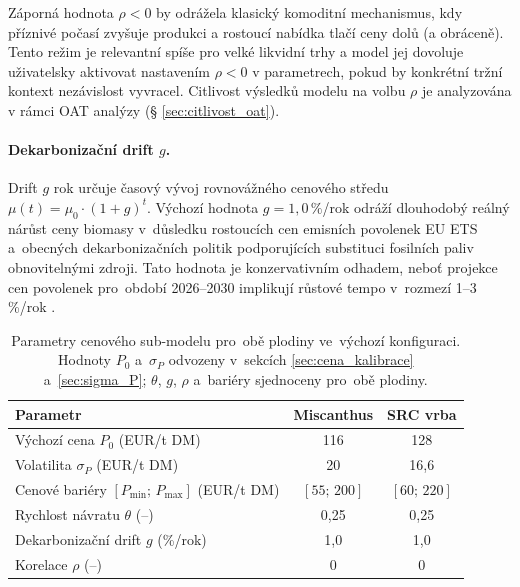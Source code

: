 Záporná hodnota $\rho < 0$ by odrážela klasický komoditní mechanismus, 
kdy příznivé počasí zvyšuje produkci a rostoucí nabídka tlačí ceny dolů 
(a obráceně). Tento režim je relevantní spíše pro velké likvidní trhy 
a model jej dovoluje uživatelsky aktivovat nastavením $\rho < 0$ 
v parametrech, pokud by konkrétní tržní kontext nezávislost vyvracel. 
Citlivost výsledků modelu na volbu $\rho$ je analyzována v rámci OAT 
analýzy (§ \ref{sec:citlivost_oat}).

\paragraph{Dekarbonizační drift $g$.}
Drift $g$ rok určuje časový vývoj rovnovážného
cenového středu $\mu(t) = \mu_0 \cdot (1 + g)^t$.
Výchozí hodnota $g = 1{,}0\,\%$/rok odráží dlouhodobý reálný nárůst
ceny biomasy v~důsledku rostoucích cen emisních povolenek EU ETS
\citep{EuropeanCommission2024} a~obecných dekarbonizačních politik
podporujících substituci fosilních paliv obnovitelnými zdroji.
Tato hodnota je konzervativním odhadem, neboť projekce cen povolenek
pro~období 2026--2030 implikují růstové tempo v~rozmezí
1--3\,\%/rok \citep{ERU2025VymerBiomasa}.


\begin{table}[htbp]
\caption{Parametry cenového sub-modelu pro~obě plodiny ve~výchozí
konfiguraci. Hodnoty $P_0$ a~$\sigma_P$ odvozeny v~sekcích
\ref{sec:cena_kalibrace} a~\ref{sec:sigma_P};
$\theta$, $g$, $\rho$ a~bariéry sjednoceny pro~obě plodiny.}
\label{tab:cenovy_model_param}
\centering
\begin{tabular}{lcc}
\toprule
\textbf{Parametr} & \textbf{Miscanthus} & \textbf{SRC vrba} \\
\midrule
Výchozí cena $P_0$ (EUR/t DM)             & 116     & 128     \\
Volatilita $\sigma_P$ (EUR/t DM)          & 20      & 16{,}6  \\
Cenové bariéry $[P_{\min};\, P_{\max}]$ (EUR/t DM)
                                          & $[55;\, 200]$ & $[60;\, 220]$ \\
Rychlost návratu $\theta$ (--)            & 0{,}25  & 0{,}25  \\
Dekarbonizační drift $g$ (\%/rok)         & 1{,}0   & 1{,}0   \\
Korelace $\rho$ (--)                      & 0       & 0       \\
\bottomrule
\end{tabular}
\end{table}

